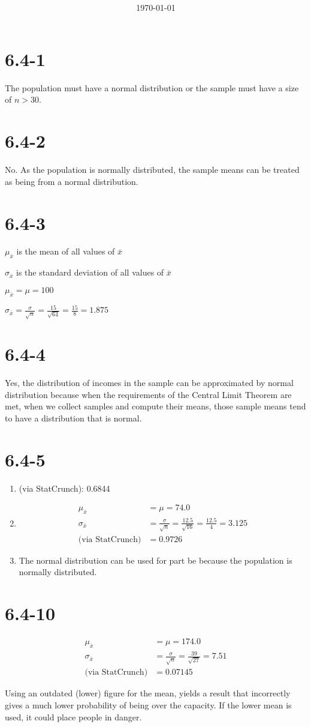 \documentclass[12pt,fleqn]{article}
\title{\classdescription\ \\ \classname\ \\ $\ $ \\ \assignment}
\author{\authorname}
\date{\today}
\newcommand{\chapter}{6.4}
\newcommand{\problem}[1]{\vspace{5ex}\section*{\chapter-#1}}
\begin{document}
\maketitle


\problem{1}
The population must have a normal distribution or the sample must have a size of $n > 30$.


\problem{2}
No. As the population is normally distributed, the sample means can be treated as being from a normal distribution.


\problem{3}
$\mu_{\bar{x}}$ is the mean of all values of $\bar{x}$

$\sigma_{\bar{x}}$ is the standard deviation of all values of $\bar{x}$

$\mu_{\bar{x}} = \mu = 100$

$\sigma_{\bar{x}} = \frac{\sigma}{\sqrt{n}} = \frac{15}{\sqrt{64}} = \frac{15}{8} = 1.875$


\problem{4}
Yes, the distribution of incomes in the sample can be approximated by normal distribution because when the requirements of the Central Limit Theorem are met, when we collect samples and compute their means, those sample means tend to have a distribution that is normal.


\problem{5}
\begin{enumerate}[label=\alph*.]
\item (via StatCrunch): 0.6844
\item
  \begin{align*}
    \mu_{\bar{x}} &= \mu = 74.0 \\
    \sigma_{\bar{x}} &= \frac{\sigma}{\sqrt{n}} = \frac{12.5}{\sqrt{16}} = \frac{12.5}{4} = 3.125 \\
    \text{(via StatCrunch)} &= 0.9726
  \end{align*}

\item The normal distribution can be used for part be because the population is normally distributed.
\end{enumerate}



\problem{10}
\begin{align*}
  \mu_{\bar{x}} &= \mu = 174.0 \\
  \sigma_{\bar{x}} &= \frac{\sigma}{\sqrt{n}} = \frac{39}{\sqrt{27}} = 7.51 \\
  \text{(via StatCrunch)} &= 0.07145
\end{align*}

Using an outdated (lower) figure for the mean, yields a result that incorrectly gives a much lower probability of being over the capacity. If the lower mean is used, it could place people in danger.
\end{document}

